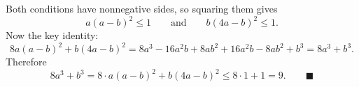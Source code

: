 Both conditions have nonnegative sides, so squaring them gives
\[a(a-b)^2\le1\qquad\text{and}\qquad b(4a-b)^2\le1.\]
Now the key identity:
\[8a(a-b)^2+b(4a-b)^2=8a^3-16a^2b+8ab^2+16a^2b-8ab^2+b^3=8a^3+b^3.\]
Therefore
\[8a^3+b^3=8\cdot a(a-b)^2+b(4a-b)^2\le8\cdot1+1=9.\qquad\blacksquare\]
